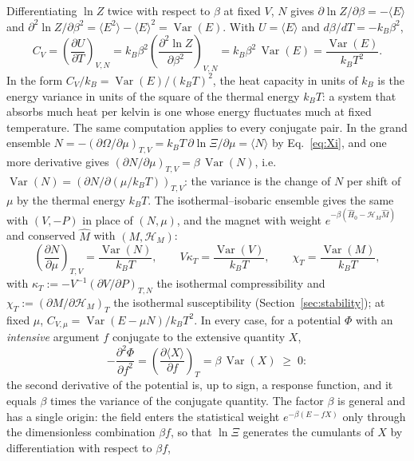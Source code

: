 \documentclass[10pt,a4paper]{article}
\theoremstyle{remark}
\newcommand{\Var}{\operatorname{Var}}
\newcommand{\hmag}{\mathcal{H}_M}
\begin{document}
Differentiating $\ln Z$ twice with respect to $\beta$ at fixed $V$, $N$ gives
$\partial\ln Z/\partial\beta=-\langle E\rangle$ and
$\partial^{2}\ln Z/\partial\beta^{2}=\langle E^{2}\rangle-\langle E\rangle^{2}=\Var(E)$.
With $U=\langle E\rangle$ and $d\beta/dT=-k_B\beta^{2}$,
\begin{equation}\label{eq:CVvar}
  C_V=\left(\frac{\partial U}{\partial T}\right)_{V,N}
  =k_B\beta^{2}\left(\frac{\partial^{2}\ln Z}{\partial\beta^{2}}\right)_{V,N}
  =k_B\beta^{2}\,\Var(E)=\frac{\Var(E)}{k_BT^{2}} .
\end{equation}
In the form $C_V/k_B=\Var(E)/(k_BT)^{2}$, the heat capacity in units of $k_B$
is the energy variance in units of the square of the thermal energy $k_BT$: a
system that absorbs much heat per
kelvin is one whose energy fluctuates much at fixed temperature. The same
computation applies to every conjugate pair. In the grand ensemble
$N=-(\partial\Omega/\partial\mu)_{T,V}=k_BT\,\partial\ln\Xi/\partial\mu=\langle N\rangle$
by Eq.~\eqref{eq:Xi}, and one more derivative gives
$(\partial N/\partial\mu)_{T,V}=\beta\,\Var(N)$, i.e.\
$\Var(N)=(\partial N/\partial(\mu/k_BT))_{T,V}$: the variance is the change of
$N$ per shift of $\mu$ by the thermal energy $k_BT$.
The isothermal--isobaric ensemble gives the same with $(V,-P)$ in place of $(N,\mu)$,
and the magnet with weight $e^{-\beta(\hat H_0-\hmag{}\hat M)}$ and conserved $\hat M$
with $(M,\hmag{})$:
\begin{equation}\label{eq:fluctresp}
  \left(\frac{\partial N}{\partial\mu}\right)_{T,V}=\frac{\Var(N)}{k_BT},\qquad
  V\kappa_T=\frac{\Var(V)}{k_BT},\qquad
  \chi_T=\frac{\Var(M)}{k_BT},
\end{equation}
with $\kappa_T:=-V^{-1}(\partial V/\partial P)_{T,N}$ the isothermal
compressibility and $\chi_T:=(\partial M/\partial\hmag{})_{T}$ the
isothermal susceptibility (Section~\ref{sec:stability}); at fixed $\mu$,
$C_{V,\mu}=\Var(E-\mu N)/k_BT^{2}$. In every case, for a potential $\Phi$ with
an \emph{intensive} argument $f$ conjugate to the extensive quantity $X$,
\[
  -\frac{\partial^{2}\Phi}{\partial f^{2}}
  =\left(\frac{\partial\langle X\rangle}{\partial f}\right)_{T}
  =\beta\,\Var(X)\;\geq\;0 :
\]
the second derivative of the potential is, up to sign, a response function,
and it equals $\beta$ times the variance of the conjugate quantity. The
factor $\beta$ is general and has a single origin: the field enters the
statistical weight $e^{-\beta(E-fX)}$ only through the dimensionless
combination $\beta f$, so that $\ln\Xi$ generates the cumulants of $X$ by
differentiation with respect to $\beta f$,
\end{document}
